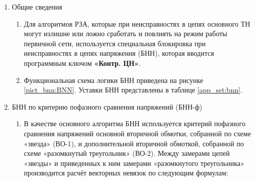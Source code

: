 
\color{black}

\begin{enumerate}[label=\arabic{section}.\arabic{subsection}.\arabic{enumi}, labelsep=4pt, leftmargin=0pt, itemindent=57pt, itemsep=0pt, parsep=5pt] %

\item Общие сведения
\begin{enumerate}[label=\arabic{section}.\arabic{subsection}.\arabic{enumi}.\arabic*, labelsep=4pt, leftmargin=0em, itemindent=65pt, parsep=0pt]

\item
Для алгоритмов РЗА, которые при неисправностях в цепях основного ТН могут излишне или ложно сработать и повлиять на режим работы первичной сети, используется специальная блокировка при неисправностях в цепях напряжения (БНН), которая вводится программным ключом \textbf{«Контр. ЦН»}.

\item
Функциональная схема логики БНН приведена на рисунке \ref{pict_bnn:BNN}. Уставки БНН представлены в таблице \ref{app_set:bnn}.

\end{enumerate}

\item БНН по критерию пофазного сравнения напряжений (БНН-ф)
\begin{enumerate}[label=\arabic{section}.\arabic{subsection}.\arabic{enumi}.\arabic*, labelsep=4pt, leftmargin=0em, itemindent=65pt, parsep=0pt]

\item
В качестве основного алгоритма БНН используется критерий пофазного сравнения напряжений основной вторичной обмотки, собранной по схеме «звезда» (ВО-1), и дополнительной вторичной обмоткой, собранной по схеме «разомкнутый треугольник» (ВО-2). Между замерами цепей «звезды» и приведенных к ним замерами «разомкнутого треугольника» производится расчёт векторных невязок по следующим формулам:


\end{enumerate}
\end{enumerate}
